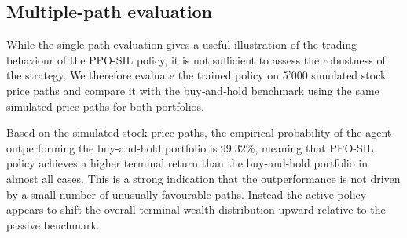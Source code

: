 \subsection{Multiple-path evaluation}
\label{section: Multiple-path evaluation}
While the single-path evaluation gives a useful illustration of the trading behaviour of the PPO-SIL policy, it is not sufficient to assess the robustness of the strategy. We therefore evaluate the trained policy on 5'000 simulated stock price paths and compare it with the buy‑and‑hold benchmark using the same simulated price paths for both portfolios.

Based on the simulated stock price paths, the empirical probability of the agent outperforming the buy-and-hold portfolio is 99.32\%, meaning that PPO-SIL policy achieves a higher terminal return than the buy-and-hold portfolio in almost all cases. This is a strong indication that the outperformance is not driven by a small number of unusually favourable paths. Instead the active policy appears to shift the overall terminal wealth distribution upward relative to the passive benchmark. 

